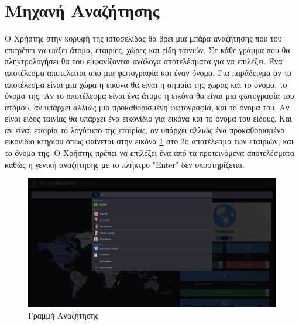 \section{Μηχανή Αναζήτησης}
Ο Χρήστης στην κορυφή της ιστοσελίδας θα βρει μια μπάρα αναζήτησης που του επιτρέπει να ψάξει άτομα, εταιρίες, χώρες και είδη ταινιών. Σε κάθε γράμμα που θα πληκτρολογήσει θα του εμφανίζονται ανάλογα αποτελέσματα για να επιλέξει. Ένα αποτέλεσμα αποτελείται από μια φωτογραφία και έναν όνομα. Για παράδειγμα αν το αποτέλεσμα είναι μια χώρα η εικόνα θα είναι η σημαία της χώρας και το όνομα, το όνομα της. Αν το αποτέλεσμα είναι ένα άτομο η εικόνα θα είναι μια φωτογραφία του ατόμου, αν υπάρχει αλλιώς μια προκαθορισμένη φωτογραφία, και το όνομα του. Αν είναι είδος ταινίας θα υπάρχει ένα εικονίδιο για εικόνα και το όνομα του είδους. Και αν είναι εταιρία το λογότυπο της εταιρίας, αν υπάρχει αλλιώς ένα προκαθορισμένο εικονίδιο κτηρίου όπως φαίνεται στην εικόνα \ref{demo:searchbar} στο 2ο αποτέλεσμα των εταιριών, και το όνομα της. Ο Χρήστης πρέπει να επιλέξει ένα από τα προτεινόμενα αποτελέσματα καθώς η γενική αναζήτησης με το πλήκτρο "Enter" δεν υποστηρίζεται.

\begin{figure}[H]
  \centering
  \includegraphics[width=145mm]{Chapters/6 - Manual/Images/main_page_searchbar.png}
  \caption{Γραμμή Αναζήτησης}
  \label{demo:searchbar}
\end{figure}